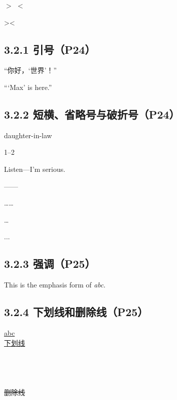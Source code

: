 \documentclass{ctexart}
\begin{document}
		$>$ $<$ 
		
		\textgreater \textless 
	\subsection*{3.2.1 引号（P24）}
		“你好，‘世界’！” 
		
		``\thinspace`Max' is here.'' 
    
	\subsection*{3.2.2 短横、省略号与破折号（P24）}
		daughter-in-law

		1--2
		
		Listen---I'm serious.
		
		——
		
		……
		
		\ldots
		
		...
    
	\subsection*{3.2.3 强调（P25）}
		This is the emphasis form of \emph{abc}.
    
	\subsection*{3.2.4 下划线和删除线（P25）}
		\underline{abc} \\
		\uline{下划线} \\
		 \\
		 \\
		 \\
		 \\
		\sout{删除线} \\

    
    
    
    
    
    
    
\end{document}
